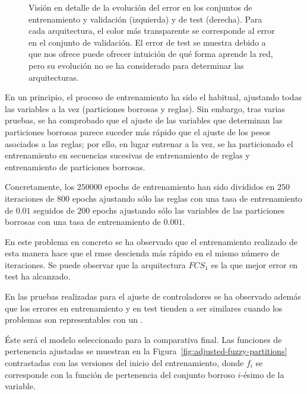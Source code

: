 \begin{figure}
	\centering
	\qquad
	\caption[Evolución del error durante el entrenamiento en las arquitecturas de \acrshort{fcs} para el modelo longitudinal]{Visión en detalle de la evolución del error en los conjuntos de entrenamiento y validación (izquierda) y de test (derecha). Para cada arquitectura, el color más transparente se corresponde al error en el conjunto de validación. El error de test se muestra debido a que nos ofrece puede ofrecer intuición de qué forma aprende la red, pero su evolución no se ha considerado para determinar las arquitecturas.}
	\label{fig:lm-fcs-rmse-all-comparisons}
\end{figure}

En un principio, el proceso de entrenamiento ha sido el habitual, ajustando todas las variables a la vez (particiones borrosas y reglas). Sin embargo, tras varias pruebas, se ha comprobado que el ajuste de las variables que determinan las particiones borrosas parece suceder más rápido que el ajuste de los pesos asociados a las reglas; por ello, en lugar entrenar a la vez, se ha particionado el entrenamiento en secuencias sucesivas de entrenamiento de reglas y entrenamiento de particiones borrosas.

Concretamente, los $250000$ epochs de entrenamiento han sido divididos en $250$ iteraciones de $800$ epochs ajustando sólo las reglas con una tasa de entrenamiento de $0.01$ seguidos de $200$ epochs ajustando sólo las variables de las particiones borrosas con una tasa de entrenamiento de $0.001$.

En este problema en concreto se ha observado que el entrenamiento realizado de esta manera hace que el \ac{rmse} descienda más rápido en el mismo número de iteraciones. Se puede observar que la arquitectura $FCS_1$ es la que mejor error en test ha alcanzado.

En las pruebas realizadas para el ajuste de controladores se ha observado además que los errores en entrenamiento y en test tienden a ser similares cuando los problemas son representables con un .

Éste será el modelo seleccionado para la comparativa final. Las funciones de pertenencia ajustadas se muestran en la Figura~\ref{fig:adjusted-fuzzy-partitions} contrastadas con las versiones del inicio del entrenamiento, donde $f_i$ se corresponde con la función de pertenencia del conjunto borroso $i$-ésimo de la variable.

